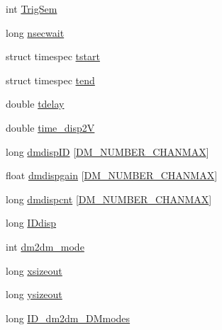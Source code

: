 \begin{DoxyCompactItemize}
\item 
int \hyperlink{structAOLOOPCONTROL__DM__DISPCOMB__CONF_a81fbd1321228bff0cf9c3116859fb9dd}{Trig\+Sem}
\item 
long \hyperlink{structAOLOOPCONTROL__DM__DISPCOMB__CONF_ab9dec2433b76227ace8aca7fc7663a7f}{nsecwait}
\item 
struct timespec \hyperlink{structAOLOOPCONTROL__DM__DISPCOMB__CONF_a3be151c816bca61cb3b71ca59a4eb637}{tstart}
\item 
struct timespec \hyperlink{structAOLOOPCONTROL__DM__DISPCOMB__CONF_a5fd9f2a167ca2ba287624ad8d6d28a90}{tend}
\item 
double \hyperlink{structAOLOOPCONTROL__DM__DISPCOMB__CONF_a6ae0fd0100b1504b329a1b5ce52a6a43}{tdelay}
\item 
double \hyperlink{structAOLOOPCONTROL__DM__DISPCOMB__CONF_a25afb933a8ce78112175b58ba629df8a}{time\+\_\+disp2\+V}
\item 
long \hyperlink{structAOLOOPCONTROL__DM__DISPCOMB__CONF_a46c1a0d62cf3ddd7987af2669c80a59a}{dmdisp\+I\+D} \mbox{[}\hyperlink{AOloopControl__DM_8h_a9a7706e372afbef5fa4868ea819455e6}{D\+M\+\_\+\+N\+U\+M\+B\+E\+R\+\_\+\+C\+H\+A\+N\+M\+A\+X}\mbox{]}
\item 
float \hyperlink{structAOLOOPCONTROL__DM__DISPCOMB__CONF_a7d29ec5becddc437436e1fa6a96d32e3}{dmdispgain} \mbox{[}\hyperlink{AOloopControl__DM_8h_a9a7706e372afbef5fa4868ea819455e6}{D\+M\+\_\+\+N\+U\+M\+B\+E\+R\+\_\+\+C\+H\+A\+N\+M\+A\+X}\mbox{]}
\item 
long \hyperlink{structAOLOOPCONTROL__DM__DISPCOMB__CONF_a72b320b81c4e6f1c009489671ddcb620}{dmdispcnt} \mbox{[}\hyperlink{AOloopControl__DM_8h_a9a7706e372afbef5fa4868ea819455e6}{D\+M\+\_\+\+N\+U\+M\+B\+E\+R\+\_\+\+C\+H\+A\+N\+M\+A\+X}\mbox{]}
\item 
long \hyperlink{structAOLOOPCONTROL__DM__DISPCOMB__CONF_ab151828b7348a78c72d11f086a4b97dd}{I\+Ddisp}
\item 
int \hyperlink{structAOLOOPCONTROL__DM__DISPCOMB__CONF_a8a44319995ded964e919057658a12d1e}{dm2dm\+\_\+mode}
\item 
long \hyperlink{structAOLOOPCONTROL__DM__DISPCOMB__CONF_a9ada2c0e7b04de12754fed048a4128af}{xsizeout}
\item 
long \hyperlink{structAOLOOPCONTROL__DM__DISPCOMB__CONF_a86ed41abdfe7e97373b97b5b180b045f}{ysizeout}
\item 
long \hyperlink{structAOLOOPCONTROL__DM__DISPCOMB__CONF_a2bf434b16c3583f8c3dc176c7bd965c6}{I\+D\+\_\+dm2dm\+\_\+\+D\+Mmodes}
\item 

\end{DoxyCompactItemize}
